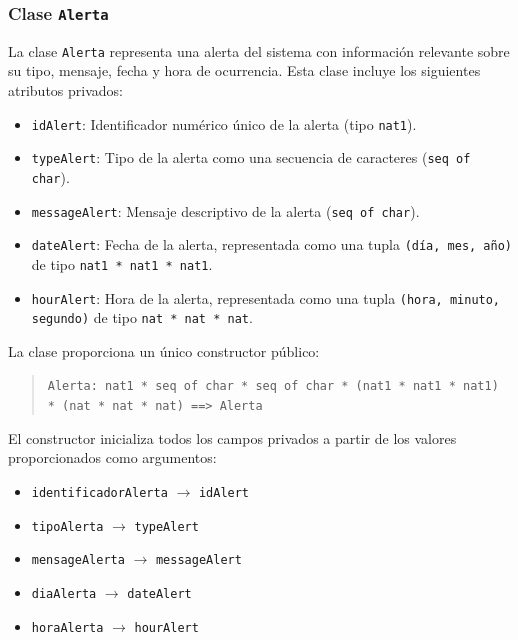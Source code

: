 \documentclass[journal]{IEEEtran}
\begin{document}
    \subsubsection*{Clase \texttt{Alerta}}

    La clase \texttt{Alerta} representa una alerta del sistema con información relevante sobre su tipo, mensaje, fecha y hora de ocurrencia. Esta clase incluye los siguientes atributos privados:

    \begin{itemize}
    \item \texttt{idAlert}: Identificador numérico único de la alerta (tipo \texttt{nat1}).
    \item \texttt{typeAlert}: Tipo de la alerta como una secuencia de caracteres (\texttt{seq of char}).
    \item \texttt{messageAlert}: Mensaje descriptivo de la alerta (\texttt{seq of char}).
    \item \texttt{dateAlert}: Fecha de la alerta, representada como una tupla \texttt{(día, mes, año)} de tipo \texttt{nat1 * nat1 * nat1}.
    \item \texttt{hourAlert}: Hora de la alerta, representada como una tupla \texttt{(hora, minuto, segundo)} de tipo \texttt{nat * nat * nat}.
    \end{itemize}

    La clase proporciona un único constructor público:

    \begin{quote}
    \texttt{Alerta: nat1 * seq of char * seq of char * (nat1 * nat1 * nat1) * (nat * nat * nat) \texttt{==>} Alerta}
    \end{quote}

    El constructor inicializa todos los campos privados a partir de los valores proporcionados como argumentos:
    \begin{itemize}
    \item \texttt{identificadorAlerta} $\rightarrow$ \texttt{idAlert}
    \item \texttt{tipoAlerta} $\rightarrow$ \texttt{typeAlert}
    \item \texttt{mensageAlerta} $\rightarrow$ \texttt{messageAlert}
    \item \texttt{diaAlerta} $\rightarrow$ \texttt{dateAlert}
    \item \texttt{horaAlerta} $\rightarrow$ \texttt{hourAlert}
    \end{itemize}


\end{document}

